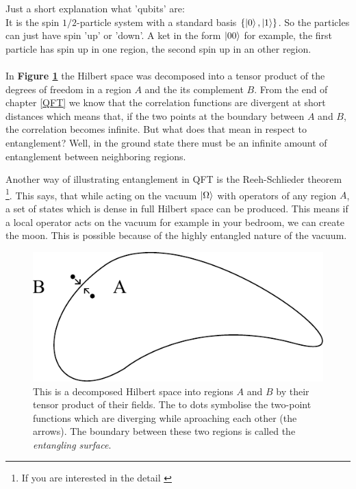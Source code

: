 	Just a short explanation what 'qubits' are: \\
	It is the spin $1/2$-particle system with a standard basis $\{\ket{0}, \ket{1}\}$. So the particles can just have spin 'up' or 'down'. A ket in the form $\ket{00}$ for example, the first particle has spin up in one region, the second spin up in an other region.
	\\ \\	
	In \textbf{Figure \ref{entangling_surface}} the Hilbert space was decomposed into a tensor product of the degrees of freedom in a region $A$ and the its complement $B$. From the end of chapter \ref{QFT} we know that the correlation functions are divergent at short distances which means that, if the two points at the boundary between $A$ and $B$, the correlation becomes infinite. But what does that mean in respect to entanglement? Well, in the ground state there must be an infinite amount of entanglement between neighboring regions. 
	
	
	Another way of illustrating entanglement in QFT is the Reeh-Schlieder theorem \footnote{If you are interested in the detail \cite{StreaterWightman}}. This says, that while acting on the vacuum $\ket{\Omega}$ with operators of any region $A$, a set of states which is dense in full Hilbert space can be produced. This means if a local operator acts on the vacuum for example in your bedroom, we can create the moon. This is possible because of the highly entangled nature of the vacuum.  
	
%	 
	\begin{figure}[htbp]
		\begin{center}
			\includegraphics[scale=1]{entangledcorr}
			\caption{This is a decomposed Hilbert space into regions $A$ and $B$ by their tensor product of their fields. The to dots symbolise the two-point functions which are diverging while aproaching each other (the arrows). The boundary between these two regions is called the \textit{entangling surface}.} \label{entangling_surface}
		\end{center}
	\end{figure}		
\FloatBarrier